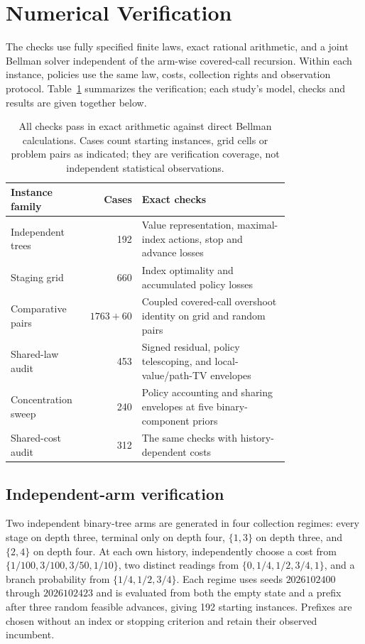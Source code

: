 \section{Numerical Verification}
\label{app:experiments}

The checks use fully specified finite laws, exact rational arithmetic, and a
joint Bellman solver independent of the arm-wise covered-call recursion.
Within each instance, policies use the same law, costs, collection rights and
observation protocol. Table~\ref{tab:verification-summary} summarizes the
verification; each study's model, checks and results are given together below.

\begin{table}[htb]
\centering\small
\begin{tabular}{p{0.25\linewidth}rp{0.53\linewidth}}
\toprule
Instance family & Cases & Exact checks \\
\midrule
Independent trees & 192 & Value representation, maximal-index actions, stop and advance losses \\
Staging grid & 660 & Index optimality and accumulated policy losses \\
Comparative pairs & $1763+60$ & Coupled covered-call overshoot identity on grid and random pairs \\
Shared-law audit & 453 & Signed residual, policy telescoping, and local-value/path-TV envelopes \\
Concentration sweep & 240 & Policy accounting and sharing envelopes at five binary-component priors \\
Shared-cost audit & 312 & The same checks with history-dependent costs \\
\bottomrule
\end{tabular}
\caption{All checks pass in exact arithmetic against direct Bellman calculations.
Cases count starting instances, grid cells or problem pairs as indicated;
they are verification coverage, not independent statistical observations.}
\label{tab:verification-summary}
\end{table}

\subsection{Independent-arm verification}
\label{app:finite-results}

Two independent binary-tree arms are generated in four collection regimes:
every stage on depth three, terminal only on depth four, $\{1,3\}$ on depth
three, and $\{2,4\}$ on depth four. At each own history, independently choose
a cost from $\{1/100,3/100,3/50,1/10\}$, two distinct readings from
$\{0,1/4,1/2,3/4,1\}$, and a branch probability from $\{1/4,1/2,3/4\}$.
Each regime uses seeds $2026102400$ through $2026102423$ and is evaluated from
both the empty state and a prefix after three random feasible advances,
giving 192 starting instances. Prefixes are chosen without an index or
stopping criterion and retain their observed incumbent.

